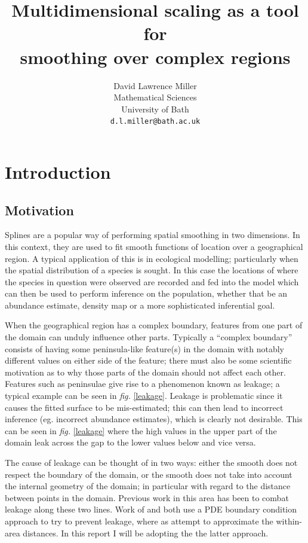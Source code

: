 \documentclass[a4paper,10pt]{article}
\title{Multidimensional scaling as a tool for \\smoothing over complex regions}
\author{David Lawrence Miller\\Mathematical Sciences\\University of Bath\\\texttt{d.l.miller@bath.ac.uk}}
\newcommand{\fig}[1]{\emph{fig.} \ref{#1}}
\begin{document}
 
 
 
\newtheorem{thm}{Theorem}[section]
 
\newtheorem{defn}{Definition}[section]
 
\maketitle

\section{Introduction}

\subsection{Motivation}

Splines are a popular way of performing spatial smoothing in two dimensions. In this context, they are used to fit smooth functions of location over a geographical region. A typical application of this is in ecological modelling; particularly when the spatial distribution of a species is sought. In this case the locations of where the species in question were observed are recorded and fed into the model which can then be used to perform inference on the population, whether that be an abundance estimate, density map or a more sophisticated inferential goal.

When the geographical region has a complex boundary, features from one part of the domain can unduly influence other parts. Typically a ``complex boundary'' consists of having some peninsula-like feature(s) in the domain with notably different values on either side of the feature; there must also be some scientific motivation as to why those parts of the domain should not affect each other. Features such as peninsulae give rise to a phenomenon known as leakage; a typical example can be seen in \fig{leakage}. Leakage is problematic since it causes the fitted surface to be mis-estimated; this can then lead to incorrect inference (eg. incorrect abundance estimates), which is clearly not desirable. This can be seen in \fig{leakage} where the high values in the upper part of the domain leak across the gap to the lower values below and vice versa.

The cause of leakage can be thought of in two ways: either the smooth does not respect the boundary of the domain, or the smooth does not take into account the internal geometry of the domain; in particular with regard to the distance between points in the domain. Previous work in this area has been to combat leakage along these two lines. Work of \cite{ramsay} and \cite{soap} both use a PDE boundary condition approach to try to prevent leakage, where as \cite{wangranalli} attempt to approximate the within-area distances. In this report I will be adopting the the latter approach.
\end{document}
